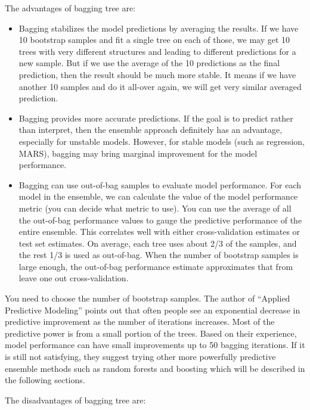 \documentclass[12pt,]{krantz}
\begin{document}
The advantages of bagging tree are:

\begin{itemize}
\item
  Bagging stabilizes the model predictions by averaging the results. If we have 10 bootstrap samples and fit a single tree on each of those, we may get 10 trees with very different structures and leading to different predictions for a new sample. But if we use the average of the 10 predictions as the final prediction, then the result should be much more stable. It means if we have another 10 samples and do it all-over again, we will get very similar averaged prediction.
\item
  Bagging provides more accurate predictions. If the goal is to predict rather than interpret, then the ensemble approach definitely has an advantage, especially for unstable models. However, for stable models (such as regression, MARS), bagging may bring marginal improvement for the model performance.
\item
  Bagging can use out-of-bag samples to evaluate model performance. For each model in the ensemble, we can calculate the value of the model performance metric (you can decide what metric to use). You can use the average of all the out-of-bag performance values to gauge the predictive performance of the entire ensemble. This correlates well with either cross-validation estimates or test set estimates. On average, each tree uses about 2/3 of the samples, and the rest 1/3 is used as out-of-bag. When the number of bootstrap samples is large enough, the out-of-bag performance estimate approximates that from leave one out cross-validation.
\end{itemize}

You need to choose the number of bootstrap samples. The author of ``Applied Predictive Modeling'' \citep{APM} points out that often people see an exponential decrease in predictive improvement as the number of iterations increases. Most of the predictive power is from a small portion of the trees. Based on their experience, model performance can have small improvements up to 50 bagging iterations. If it is still not satisfying, they suggest trying other more powerfully predictive ensemble methods such as random forests and boosting which will be described in the following sections.

The disadvantages of bagging tree are:
\end{document}
